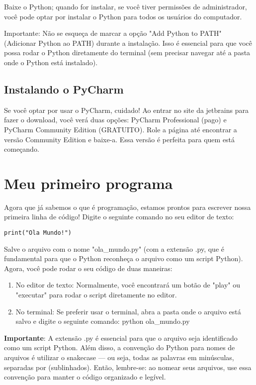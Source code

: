 \documentclass[12pt]{book}
\begin{document}
	Baixe o Python; quando for instalar, se você tiver permissões de administrador, você pode optar por instalar o Python para todos os usuários do computador.
	
	Importante: Não se esqueça de marcar a opção "Add Python to PATH" (Adicionar Python ao PATH) durante a instalação. Isso é essencial para que você possa rodar o Python diretamente do terminal (sem precisar navegar até a pasta onde o Python está instalado).
	
	\subsection{Instalando o PyCharm}
	
	Se você optar por usar o PyCharm, cuidado! Ao entrar no site da jetbrains para fazer o download, você verá duas opções: PyCharm Professional (pago) e PyCharm Community Edition (GRATUITO). Role a página até encontrar a versão Community Edition e baixe-a. Essa versão é perfeita para quem está começando.
	
	\section{Meu primeiro programa}
	
	Agora que já sabemos o que é programação, estamos prontos para escrever nossa primeira linha de código! Digite o seguinte comando no seu editor de texto:
	
	\begin{lstlisting}[caption={Olá mundo em python}] 
print("Ola Mundo!")\end{lstlisting}
	
	
	Salve o arquivo com o nome "ola\_mundo.py" (com a extensão .py, que é fundamental para que o Python reconheça o arquivo como um script Python). Agora, você pode rodar o seu código de duas maneiras:
	
	\begin{enumerate}
		\item No editor de texto: Normalmente, você encontrará um botão de "play" ou "executar" para rodar o script diretamente no editor.
		
		\item No terminal: Se preferir usar o terminal, abra a pasta onde o arquivo está salvo e digite o seguinte comando: python ola\_mundo.py	
	\end{enumerate}
	
	\textbf{Importante}: A extensão .py é essencial para que o arquivo seja identificado como um script Python. Além disso, a convenção do Python para nomes de arquivos é utilizar o snakecase — ou seja, todas as palavras em minúsculas, separadas por (sublinhados). Então, lembre-se: ao nomear seus arquivos, use essa convenção para manter o código organizado e legível.
	
\end{document}
